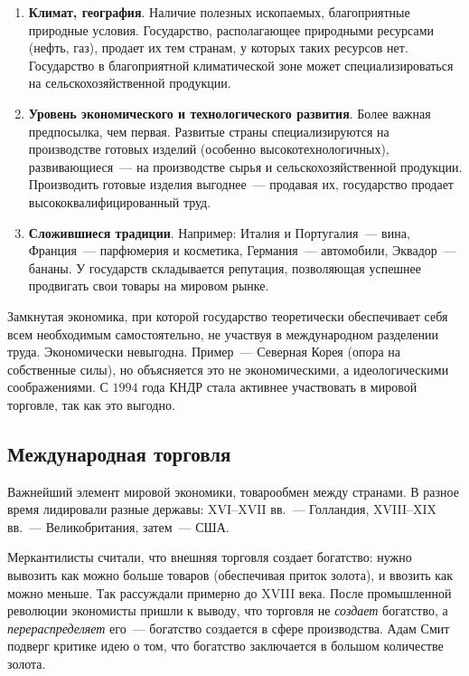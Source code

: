 \documentclass[12pt]{article}
\begin{document}
    \begin{enumerate}
    	\item \textbf{Климат, география}. Наличие полезных ископаемых, благоприятные природные условия. Государство, располагающее природными ресурсами (нефть, газ), продает их тем странам, у которых таких ресурсов нет. Государство в благоприятной климатической зоне может специализироваться на сельскохозяйственной продукции.
    	\item \textbf{Уровень экономического и технологического развития}. Более важная предпосылка, чем первая. Развитые страны специализируются на производстве готовых изделий (особенно высокотехнологичных), развивающиеся~--- на производстве сырья и сельскохозяйственной продукции. Производить готовые изделия выгоднее~--- продавая их, государство продает высококвалифицированный труд.
    	\item \textbf{Сложившиеся традиции}. Например: Италия и Португалия~--- вина, Франция~--- парфюмерия и косметика, Германия~--- автомобили, Эквадор~--- бананы. У государств складывается репутация, позволяющая успешнее продвигать свои товары на мировом рынке.
    \end{enumerate}
    
    \begin{note}[Автаркия]
    	Замкнутая экономика, при которой государство теоретически обеспечивает себя всем необходимым самостоятельно, не участвуя в международном разделении труда. Экономически невыгодна. Пример~--- Северная Корея (опора на собственные силы), но объясняется это не экономическими, а идеологическими соображениями. С $1994$ года КНДР стала активнее участвовать в мировой торговле, так как это выгодно.
    \end{note}
    
    \subsection{Международная торговля}
    
    \begin{definition}
    	Важнейший элемент мировой экономики, товарообмен между странами. В разное время лидировали разные державы: XVI--XVII вв.~--- Голландия, XVIII--XIX вв.~--- Великобритания, затем~--- США.
    \end{definition}
    
    \begin{note}
    	Меркантилисты считали, что внешняя торговля создает богатство: нужно вывозить как можно больше товаров (обеспечивая приток золота), и ввозить как можно меньше. Так рассуждали примерно до XVIII века. После промышленной революции экономисты пришли к выводу, что торговля не \textit{создает} богатство, а \textit{перераспределяет} его~--- богатство создается в сфере производства. Адам Смит подверг критике идею о том, что богатство заключается в большом количестве золота.
    \end{note}
    
\end{document}
